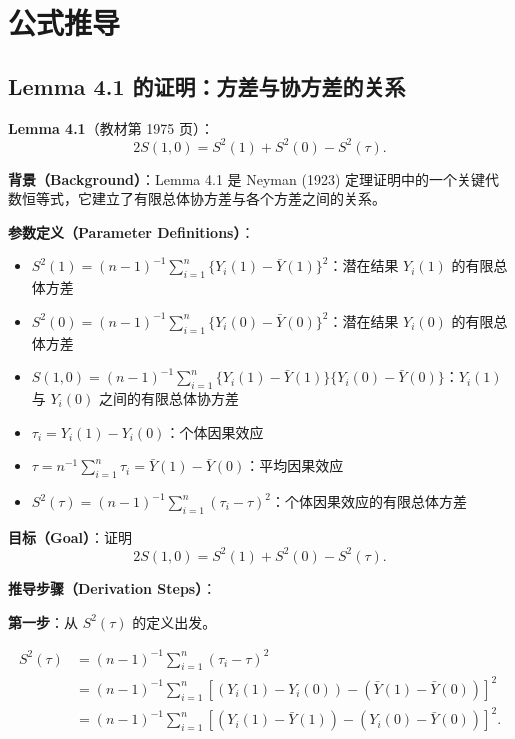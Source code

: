
\appendix
\chapter{公式推导}

\section{Lemma 4.1 的证明：方差与协方差的关系}\label{sec:appendix-lemma-4-1}

\textbf{Lemma 4.1}（教材第 1975 页）：
\[
2S(1,0) = S^2(1) + S^2(0) - S^2(\tau).
\]

\textbf{背景（Background）}：Lemma 4.1 是 Neyman (1923) 定理证明中的一个关键代数恒等式，它建立了有限总体协方差与各个方差之间的关系。

\textbf{参数定义（Parameter Definitions）}：
\begin{itemize}
  \item $S^2(1) = (n-1)^{-1}\sum_{i=1}^n \{Y_i(1) - \bar{Y}(1)\}^2$：潜在结果 $Y_i(1)$ 的有限总体方差
  \item $S^2(0) = (n-1)^{-1}\sum_{i=1}^n \{Y_i(0) - \bar{Y}(0)\}^2$：潜在结果 $Y_i(0)$ 的有限总体方差
  \item $S(1,0) = (n-1)^{-1}\sum_{i=1}^n \{Y_i(1) - \bar{Y}(1)\}\{Y_i(0) - \bar{Y}(0)\}$：$Y_i(1)$ 与 $Y_i(0)$ 之间的有限总体协方差
  \item $\tau_i = Y_i(1) - Y_i(0)$：个体因果效应
  \item $\tau = n^{-1}\sum_{i=1}^n \tau_i = \bar{Y}(1) - \bar{Y}(0)$：平均因果效应
  \item $S^2(\tau) = (n-1)^{-1}\sum_{i=1}^n (\tau_i - \tau)^2$：个体因果效应的有限总体方差
\end{itemize}

\textbf{目标（Goal）}：证明
\[
2S(1,0) = S^2(1) + S^2(0) - S^2(\tau).
\]

\textbf{推导步骤（Derivation Steps）}：

\textbf{第一步}：从 $S^2(\tau)$ 的定义出发。

\[
\begin{aligned}
S^2(\tau) &= (n-1)^{-1}\sum_{i=1}^n (\tau_i - \tau)^2 \\
&= (n-1)^{-1}\sum_{i=1}^n \left[(Y_i(1) - Y_i(0)) - (\bar{Y}(1) - \bar{Y}(0))\right]^2 \\
&= (n-1)^{-1}\sum_{i=1}^n \left[(Y_i(1) - \bar{Y}(1)) - (Y_i(0) - \bar{Y}(0))\right]^2.
\end{aligned}
\]

